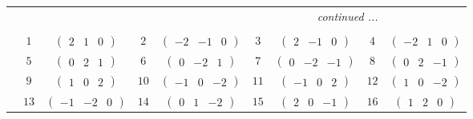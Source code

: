 \documentclass[fleqn,10pt,landscape]{article}
\begin{document}
\begin{itemize}
{\begin{center}
\begin{longtable}{ccccccccc}
 \hline \hline
\multicolumn{8}{r}{\footnotesize\it continued ...} \\ \endfoot

 \hline \hline
\multicolumn{8}{r}{} \\ \endlastfoot

 & $ 1 $ & $ \begin{pmatrix} 2 & 1 & 0 \end{pmatrix} $ & $ 2 $ & $ \begin{pmatrix} -2 & -1 & 0 \end{pmatrix} $ & $ 3 $ & $ \begin{pmatrix} 2 & -1 & 0 \end{pmatrix} $ & $ 4 $ & $ \begin{pmatrix} -2 & 1 & 0 \end{pmatrix} $ \\
& $ 5 $ & $ \begin{pmatrix} 0 & 2 & 1 \end{pmatrix} $ & $ 6 $ & $ \begin{pmatrix} 0 & -2 & 1 \end{pmatrix} $ & $ 7 $ & $ \begin{pmatrix} 0 & -2 & -1 \end{pmatrix} $ & $ 8 $ & $ \begin{pmatrix} 0 & 2 & -1 \end{pmatrix} $ \\
& $ 9 $ & $ \begin{pmatrix} 1 & 0 & 2 \end{pmatrix} $ & $ 10 $ & $ \begin{pmatrix} -1 & 0 & -2 \end{pmatrix} $ & $ 11 $ & $ \begin{pmatrix} -1 & 0 & 2 \end{pmatrix} $ & $ 12 $ & $ \begin{pmatrix} 1 & 0 & -2 \end{pmatrix} $ \\
& $ 13 $ & $ \begin{pmatrix} -1 & -2 & 0 \end{pmatrix} $ & $ 14 $ & $ \begin{pmatrix} 0 & 1 & -2 \end{pmatrix} $ & $ 15 $ & $ \begin{pmatrix} 2 & 0 & -1 \end{pmatrix} $ & $ 16 $ & $ \begin{pmatrix} 1 & 2 & 0 \end{pmatrix} $ \\

\end{longtable}
\end{center}}
\end{itemize}
\end{document}
